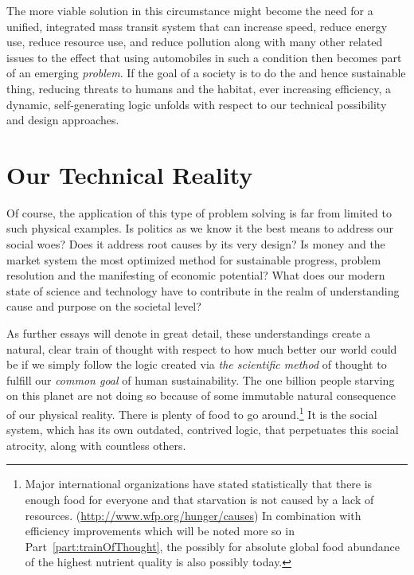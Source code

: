 \documentclass[10pt, a4paper, cleardoubleempty, openright, twoside]{book}
\begin{document}
The more viable solution in this circumstance might become the need for
a unified, integrated mass transit system that can increase speed,
reduce energy use, reduce resource use, and reduce pollution along with
many other related issues to the effect that using automobiles in such a
condition then becomes part of an emerging \emph{problem}. If the goal
of a society is to do the  and hence sustainable
thing, reducing threats to humans and the habitat, ever increasing
efficiency, a dynamic, self-generating logic unfolds with respect to our
technical possibility and design approaches.

\section {Our Technical Reality}

Of course, the application of this type of problem solving is far from
limited to such physical examples. Is politics as we know it the best
means to address our social woes? Does it address root causes by its
very design? Is money and the market system the most optimized method
for sustainable progress, problem resolution and the manifesting of
economic potential? What does our modern state of science and
technology have to contribute in the realm of understanding cause and
purpose on the societal level? 

As further essays will denote in great detail, these understandings
create a natural, clear train of thought with respect to how much better
our world could be if we simply follow the logic created via \emph{the
scientific method} of thought to fulfill our \emph{common goal} of human
sustainability. The one billion people starving on this planet are not
doing so because of some immutable natural consequence of our physical
reality. There is plenty of food to go around.\footnote{
	Major international organizations have stated statistically that there
	is enough food for everyone and that starvation is not caused by a
	lack of resources. (\url{http://www.wfp.org/hunger/causes}) In
	combination with efficiency improvements which will be noted more so
	in Part~\ref{part:trainOfThought}, the possibly for absolute global
	food abundance of the highest nutrient quality is also possibly today.
} 
It is the social system, which has its own outdated, contrived logic,
that perpetuates this social atrocity, along with countless others. 
\end{document}
